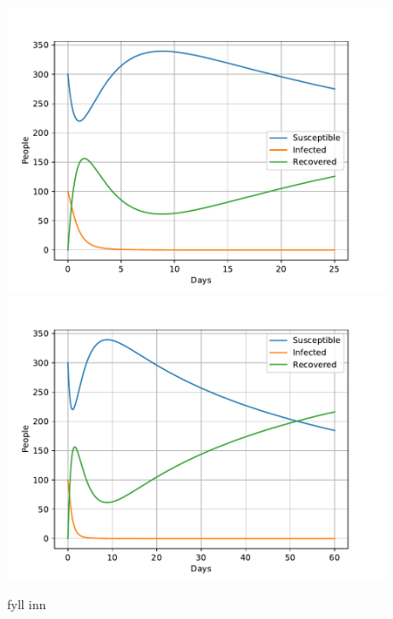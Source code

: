 \documentclass[a4paper]{article}
\begin{document}
\begin{figure}[!htb]
	\includegraphics[scale=0.56]{../plots/opp_e_D1.pdf}
	\includegraphics[scale=0.56]{../plots/opp_e_D2.pdf}
	\caption{fyll inn}
	\label{opp_e1}
\end{figure}
\end{document}
